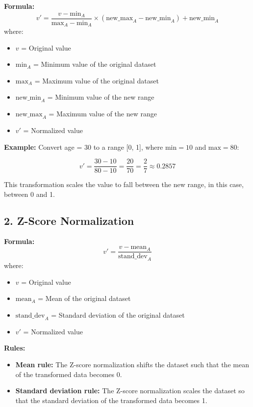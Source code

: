 \documentclass[a4paper,10pt]{article}
\begin{document}
\textbf{Formula:}
\[
v' = \frac{v - \text{min}_A}{\text{max}_A - \text{min}_A} \times (\text{new\_max}_A - \text{new\_min}_A) + \text{new\_min}_A
\]
where:
\begin{itemize}
    \item \( v \) = Original value  
    \item \( \text{min}_A \) = Minimum value of the original dataset  
    \item \( \text{max}_A \) = Maximum value of the original dataset  
    \item \( \text{new\_min}_A \) = Minimum value of the new range  
    \item \( \text{new\_max}_A \) = Maximum value of the new range  
    \item \( v' \) = Normalized value
\end{itemize}

\textbf{Example:}  
Convert age = 30 to a range [0, 1], where \( \text{min} = 10 \) and \( \text{max} = 80 \):

\[
v' = \frac{30 - 10}{80 - 10} = \frac{20}{70} = \frac{2}{7} \approx 0.2857
\]

This transformation scales the value to fall between the new range, in this case, between 0 and 1.

\vspace{0.5cm}

\subsection*{2. Z-Score Normalization}

\textbf{Formula:}
\[
v' = \frac{v - \text{mean}_A}{\text{stand\_dev}_A}
\]
where:
\begin{itemize}
    \item \( v \) = Original value  
    \item \( \text{mean}_A \) = Mean of the original dataset  
    \item \( \text{stand\_dev}_A \) = Standard deviation of the original dataset  
    \item \( v' \) = Normalized value
\end{itemize}

\textbf{Rules:}
\begin{itemize}
    \item \textbf{Mean rule:} The Z-score normalization shifts the dataset such that the mean of the transformed data becomes 0.  
    \item \textbf{Standard deviation rule:} The Z-score normalization scales the dataset so that the standard deviation of the transformed data becomes 1.  
\end{itemize}
\end{document}
